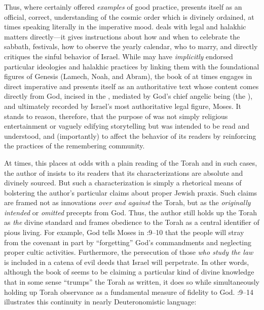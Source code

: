 Thus, where \ga certainly offered \emph{examples} of good practice, \jub presents itself as an official, correct, understanding of the cosmic order which is divinely ordained, at times speaking literally in the imperative mood. \jub deals with legal and halakhic matters directly---it gives instructions about how and when to celebrate the sabbath, festivals, how to observe the yearly calendar, who to marry, and directly critiques the sinful behavior of Israel. While \ga may have \emph{implicitly} endorsed particular ideologies and halakhic practices by linking them with the foundational figures of Genesis (Lamech, Noah, and Abram), the book of \jub at times engages in direct imperative and presents itself as an authoritative text whose content comes directly from God, incised in the \heavenlytablets, mediated by God's chief angelic being (the \ap), and ultimately recorded by Israel's most authoritative legal figure, Moses. It stands to reason, therefore, that the purpose of \jub was not simply religious entertainment or vaguely edifying storytelling but was intended to be read and understood, and (importantly) to affect the behavior of its readers by reinforcing the practices of the remembering community.

At times, this places \jub at odds with a plain reading of the Torah and in such cases, the author of \jub insists to its readers that its characterizations are absolute and divinely sourced. But such a characterization is simply a rhetorical means of bolstering the author's particular claims about proper Jewish praxis. Such claims are framed not as innovations \emph{over and against} the Torah, but as the \emph{originally intended} or \emph{omitted} precepts from God. %
Thus, the author still holds up the Torah as \emph{the} divine standard and frames obedience to the Torah as a central identifier of pious living. For example, God tells Moses in :9--10 that the people will stray from the covenant in part by ``forgetting'' God's commandments and neglecting proper cultic activities. Furthermore, the persecution of those \emph{who study the law} is included in a catena of evil deeds that Israel will perpetrate. In other words, although the book of \jub seems to be claiming a particular kind of divine knowledge that in some sense ``trumps'' the Torah as written, it does so while simultaneously holding up Torah observance as a fundamental measure of fidelity to God. :9--14 illustrates this continuity in nearly Deuteronomistic language:


